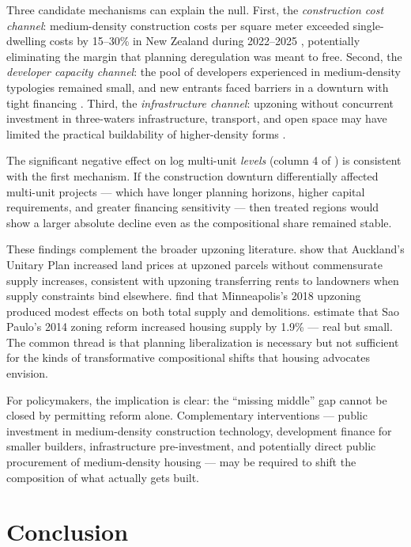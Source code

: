 \documentclass[12pt]{article}
\begin{document}
Three candidate mechanisms can explain the null. First, the \textit{construction cost channel}: medium-density construction costs per square meter exceeded single-dwelling costs by 15--30\% in New Zealand during 2022--2025 \citep{mbie2023building}, potentially eliminating the margin that planning deregulation was meant to free. Second, the \textit{developer capacity channel}: the pool of developers experienced in medium-density typologies remained small, and new entrants faced barriers in a downturn with tight financing \citep{nzpc2012housing}. Third, the \textit{infrastructure channel}: upzoning without concurrent investment in three-waters infrastructure, transport, and open space may have limited the practical buildability of higher-density forms \citep{mfe2020national}.

The significant negative effect on log multi-unit \textit{levels} (column 4 of ) is consistent with the first mechanism. If the construction downturn differentially affected multi-unit projects --- which have longer planning horizons, higher capital requirements, and greater financing sensitivity --- then treated regions would show a larger absolute decline even as the compositional share remained stable.

These findings complement the broader upzoning literature. \citet{greenaway2023upzoning} show that Auckland's Unitary Plan increased land prices at upzoned parcels without commensurate supply increases, consistent with upzoning transferring rents to landowners when supply constraints bind elsewhere. \citet{been2023supply} find that Minneapolis's 2018 upzoning produced modest effects on both total supply and demolitions. \citet{anagol2024estimating} estimate that Sao Paulo's 2014 zoning reform increased housing supply by 1.9\% --- real but small. The common thread is that planning liberalization is necessary but not sufficient for the kinds of transformative compositional shifts that housing advocates envision.

For policymakers, the implication is clear: the ``missing middle'' gap cannot be closed by permitting reform alone. Complementary interventions --- public investment in medium-density construction technology, development finance for smaller builders, infrastructure pre-investment, and potentially direct public procurement of medium-density housing --- may be required to shift the composition of what actually gets built.


\section{Conclusion}
\end{document}
